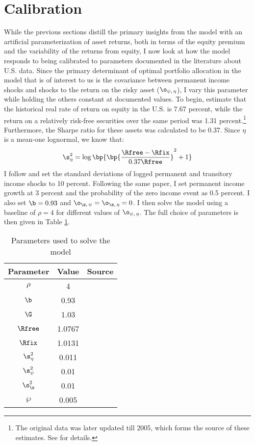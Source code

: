 \section{Calibration}\label{us_data}

While the previous sections distill the primary insights from the model with an artificial parameterization of asset returns, both in terms of the equity premium and the variability of the returns from equity, I now look at how the model responds to being calibrated to parameters documented in the literature about U.S. data. Since the primary determinant of optimal portfolio allocation in the model that is of interest to us is the covariance between permanent income shocks and shocks to the return on the risky asset ($\o_{\psi,\,\eta}$), I vary this parameter while holding the others constant at documented values. To begin, \citet{Mehra1985} estimate that the historical real rate of return on equity in the U.S. is 7.67 percent, while the return on a relatively risk-free securities over the same period was 1.31 percent.\footnote{The original data was later updated till 2005, which forms the source of these estimates. See \citet{Mehra2006} for details.} Furthermore, the Sharpe ratio for these assets was calculated to be 0.37. Since $\eta$ is a mean-one lognormal, we know that:
\[
\s_{\eta}^2 = \log\bp{\bp{\frac{\Rfree - \Rfix}{0.37\Rfree}}^2 + 1}
\]
I follow \citet{Carroll1992} and set the standard deviations of logged permanent and transitory income shocks to 10 percent. Following the same paper, I set permanent income growth at 3 percent and the probability of the zero income event as 0.5 percent. I also set $\b = 0.93$ and $\o_{\z,\,\psi} = \o_{\z,\,\eta} = 0$. I then solve the model using a baseline of $\rho = 4$ for different values of $\o_{\psi,\,\eta}$. The full choice of parameters is then given in Table \ref{tab:model_parameters}.

\begin{table}[htbp]
    \begin{tabular}{ccc}
        \toprule
        Parameter & Value & Source\\
        \midrule
        $\rho$ & 4\\
        $\b$ & 0.93\\
        $\G$ & 1.03 & \citet{Carroll1992}\\
        $\Rfree$ & 1.0767 & \citet{Mehra2006}\\
        $\Rfix$ & 1.0131 & \citet{Mehra2006}\\
        $\s_{\eta}^2$ & 0.011 & \citet{Mehra2006}\\
        $\s_{\psi}^2$ & 0.01 & \citet{Carroll1992}\\
        $\s_{\z}^2$ & 0.01 & \citet{Carroll1992}\\
        $\wp$ & 0.005 & \citet{Carroll1992}\\
        \bottomrule
    \end{tabular}
    \caption{Parameters used to solve the model}
    \label{tab:model_parameters}
\end{table}

